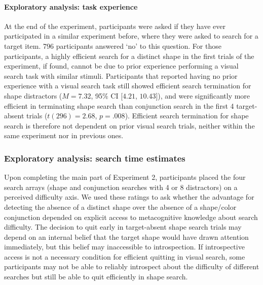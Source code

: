 \documentclass[12pt,twoside]{reedthesis}
\begin{document}
\hypertarget{exploratory-analysis-task-experience}{%
\paragraph{Exploratory analysis: task experience}\label{exploratory-analysis-task-experience}}

At the end of the experiment, participants were asked if they have ever participated in a similar experiment before, where they were asked to search for a target item. 796 participants answered `no' to this question. For those participants, a highly efficient search for a distinct shape in the first trials of the experiment, if found, cannot be due to prior experience performing a visual search task with similar stimuli. Participants that reported having no prior experience with a visual search task still showed efficient search termination for shape distractors (\(M = 7.32\), 95\% CI \([4.21\), \(10.43]\)), and were significantly more efficient in terminating shape search than conjunction search in the first 4 target-absent trials (\(t(296) = 2.68\), \(p = .008\)). Efficient search termination for shape search is therefore not dependent on prior visual search trials, neither within the same experiment nor in previous ones.

\hypertarget{exploratory-analysis-search-time-estimates}{%
\subsubsection*{Exploratory analysis: search time estimates}\label{exploratory-analysis-search-time-estimates}}

Upon completing the main part of Experiment 2, participants placed the four search arrays (shape and conjunction searches with 4 or 8 distractors) on a perceived difficulty axis. We used these ratings to ask whether the advantage for detecting the absence of a distinct shape over the absence of a shape/color conjunction depended on explicit access to metacognitive knowledge about search difficulty. The decision to quit early in target-absent shape search trials may depend on an internal belief that the target shape would have drawn attention immediately, but this belief may inaccessible to introspection. If introspective access is not a necessary condition for efficient quitting in visual search, some participants may not be able to reliably introspect about the difficulty of different searches but still be able to quit efficiently in shape search.
\end{document}
